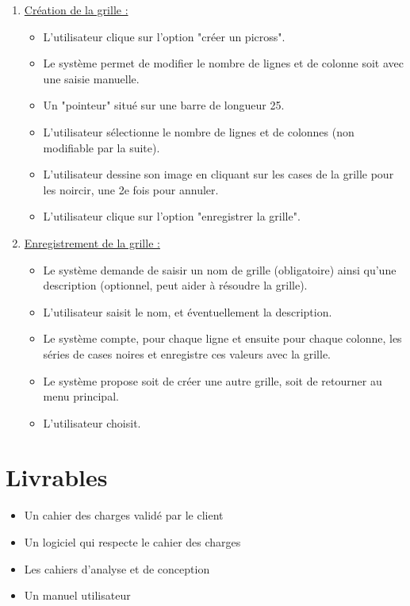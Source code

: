 \documentclass[a4paper, 12pt, twoside]{article}
\begin{document}
\begin{enumerate}
	\item{\ul{Cr\'eation de la grille :}}\newline
	\begin{itemize}	\setlength{\itemsep}{5mm}
		\item L'utilisateur clique sur l'option "créer un picross".
		\item Le système permet de modifier le nombre de lignes et de colonne soit avec une saisie manuelle.
		\item Un "pointeur" situé sur une barre de longueur 25.\newline

		\item L'utilisateur sélectionne le nombre de lignes et de colonnes (non modifiable par la suite).
		\item L'utilisateur dessine son image en cliquant sur les cases de la grille pour les noircir, une 2e fois pour annuler.
		\item L'utilisateur clique sur l'option "enregistrer la grille".
	\end{itemize}
	\item{\ul{Enregistrement de la grille :}}\newline
	\begin{itemize}	\setlength{\itemsep}{5mm}
		\item Le système demande de saisir un nom de grille (obligatoire) ainsi qu'une description (optionnel, peut aider à résoudre la grille).
		\item L'utilisateur saisit le nom, et éventuellement la description.
		\item Le système compte, pour chaque ligne et ensuite pour chaque colonne, les séries de cases noires et enregistre ces valeurs avec la grille.\newline

		\item Le système propose soit de créer une autre grille, soit de retourner au menu principal.
		\item L'utilisateur choisit.
	\end{itemize}


\end{enumerate}

\section{Livrables}

\begin{itemize}\setlength{\itemsep}{3mm}

 \item[\textbullet] Un cahier des charges validé par le client
 \item[\textbullet] Un logiciel qui respecte le cahier des charges
 \item[\textbullet] Les cahiers d'analyse et de conception
 \item[\textbullet] Un manuel utilisateur
 
\end{itemize}
\end{document}
